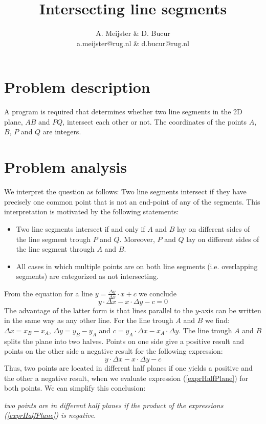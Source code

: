 \documentclass[a4paper,10pt]{article}
\title{Intersecting line segments}
\author{A. Meijster \& D. Bucur\\
        a.meijster@rug.nl \& d.bucur@rug.nl}
\begin{document}
\maketitle

\section{Problem description}
A program is required that determines whether two line segments in the 2D plane, $AB$ and $PQ$, intersect each other or not. The coordinates of the points $A$, $B$, $P$ and $Q$ are integers.

\section{Problem analysis}
We interpret the question as follows: Two line segments intersect if they have precisely one common point that is not an end-point of any of the segments.
This interpretation is motivated by the following statements:
\begin{itemize}
\item Two line segments intersect if and only if $A$ and $B$ lay on different sides of the line segment trough $P$ and $Q$. Moreover, $P$ and $Q$ lay on different sides of the line segment through $A$ and $B$.
\item All cases in which multiple points are on both line segments (i.e. overlapping segments) are categorized as not intersecting.
\end{itemize}
From the equation for a line $y = \frac{\Delta y}{\Delta x}\cdot x + c$ we conclude
$$ y\cdot \Delta x - x \cdot \Delta y - c = 0
$$ 
The advantage of the latter form is that lines parallel to the $y$-axis can be written in the same way as any other line.
For the line trough $A$ and $B$ we find: 
$\Delta x = x_B - x_A$, $\Delta y = y_B - y_A$ and $c = y_A \cdot \Delta x - x_A \cdot \Delta y$.
The line trough $A$ and $B$ splits the plane into two halves. Points on one side give a positive result and points on the other side a negative result for the following expression:
\begin{equation}\label{exprHalfPlane}
y \cdot \Delta x - x \cdot \Delta y - c
\end{equation}
Thus, two points are located in different half planes if one yields a positive and the other a negative result, when we evaluate expression (\ref{exprHalfPlane}) for both points.
We can simplify this conclusion: \\[2mm]
\centerline{\it two points are in different half planes if the product of the expressions (\ref{exprHalfPlane}) is negative.}
\end{document}
